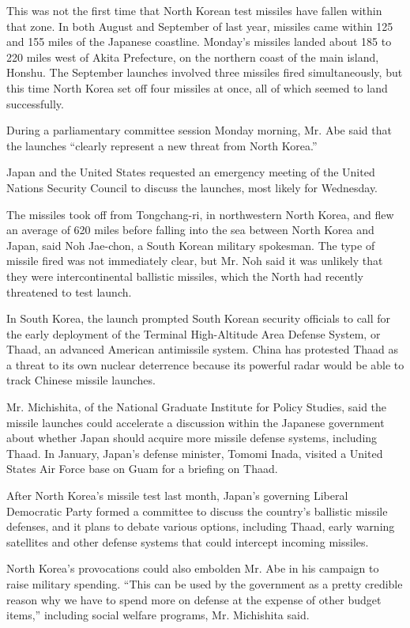 This was not the first time that North Korean test missiles have fallen
within that zone. In both August and September of last year, missiles
came within 125 and 155 miles of the Japanese coastline. Monday's
missiles landed about 185 to 220 miles west of Akita Prefecture, on the
northern coast of the main island, Honshu. The September launches
involved three missiles fired simultaneously, but this time North Korea
set off four missiles at once, all of which seemed to land successfully.

During a parliamentary committee session Monday morning, Mr. Abe said
that the launches ``clearly represent a new threat from North Korea.''

Japan and the United States requested an emergency meeting of the United
Nations Security Council to discuss the launches, most likely for
Wednesday.

The missiles took off from Tongchang-ri, in northwestern North Korea,
and flew an average of 620 miles before falling into the sea between
North Korea and Japan, said Noh Jae-chon, a South Korean military
spokesman. The type of missile fired was not immediately clear, but Mr.
Noh said it was unlikely that they were intercontinental ballistic
missiles, which the North had recently threatened to test launch.

In South Korea, the launch prompted South Korean security officials to
call for the early deployment of the Terminal High-Altitude Area Defense
System, or Thaad, an advanced American antimissile system. China has
protested Thaad as a threat to its own nuclear deterrence because its
powerful radar would be able to track Chinese missile launches.

Mr. Michishita, of the National Graduate Institute for Policy Studies,
said the missile launches could accelerate a discussion within the
Japanese government about whether Japan should acquire more missile
defense systems, including Thaad. In January, Japan's defense minister,
Tomomi Inada, visited a United States Air Force base on Guam for a
briefing on Thaad.

After North Korea's missile test last month, Japan's governing Liberal
Democratic Party formed a committee to discuss the country's ballistic
missile defenses, and it plans to debate various options, including
Thaad, early warning satellites and other defense systems that could
intercept incoming missiles.

North Korea's provocations could also embolden Mr. Abe in his campaign
to raise military spending. ``This can be used by the government as a
pretty credible reason why we have to spend more on defense at the
expense of other budget items,'' including social welfare programs, Mr.
Michishita said.

